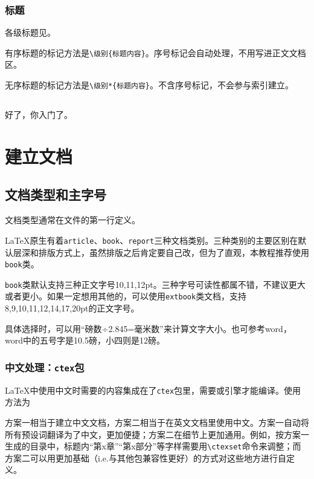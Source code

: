 \documentclass[10pt,openany]{book}
\begin{document}
\subsection{标题}

各级标题见\textit{}。

有序标题的标记方法是\texttt{\textbackslash{}级别\{标题内容\}}。序号标记会自动处理，不用写进正文文档区。

无序标题的标记方法是\texttt{\textbackslash{}级别*\{标题内容\}}。不含序号标记，不会参与索引建立。

\section*{}

好了，你入门了。

\chapter{建立文档}

\section{文档类型和主字号}

文档类型通常在文件的第一行定义。



{\LaTeX}原生有着\texttt{article}、\texttt{book}、\texttt{report}三种文档类别。三种类别的主要区别在默认层深和排版方式上，虽然排版之后肯定要自己改，但为了直观，本教程推荐使用\texttt{book}类。

\texttt{book}类默认支持三种正文字号10,11,12pt。三种字号可读性都属不错，不建议更大或者更小。如果一定想用其他的，可以使用\texttt{extbook}类文档，支持8,9,10,11,12,14,17,20pt的正文字号。

具体选择时，可以用“磅数÷2.845=毫米数”来计算文字大小。也可参考word，word中的五号字是10.5磅，小四则是12磅。

\subsection{中文处理：\texttt{ctex}包}

 {\LaTeX}中使用中文时需要的内容集成在了\texttt{ctex}包里，需要{\XeLaTeX}或{\LuaLaTeX}引擎才能编译。使用方法为



方案一相当于建立中文文档，方案二相当于在英文文档里使用中文。方案一自动将所有预设词翻译为了中文，更加便捷；方案二在细节上更加通用。例如，按方案一生成的目录中，标题内“第x章”“第x部分”等字样需要用\texttt{\textbackslash{}ctexset}命令来调整；而方案二可以用更加基础（i.e.与其他包兼容性更好）的方式对这些地方进行自定义。
\end{document}
